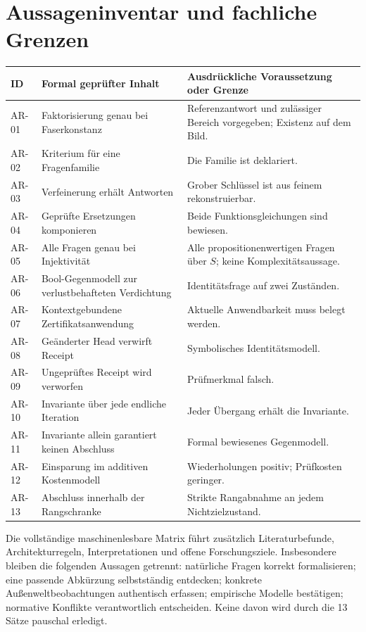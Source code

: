 \documentclass[11pt,a4paper]{article}
\begin{document}
\section{Aussageninventar und fachliche Grenzen}
\small
\begin{longtable}{@{}p{14mm}p{68mm}p{65mm}@{}}
\toprule ID & Formal geprüfter Inhalt & Ausdrückliche Voraussetzung oder Grenze\\\midrule\endhead
AR-01 & Faktorisierung genau bei Faserkonstanz & Referenzantwort und zulässiger Bereich vorgegeben; Existenz auf dem Bild.\\
AR-02 & Kriterium für eine Fragenfamilie & Die Familie ist deklariert.\\
AR-03 & Verfeinerung erhält Antworten & Grober Schlüssel ist aus feinem rekonstruierbar.\\
AR-04 & Geprüfte Ersetzungen komponieren & Beide Funktionsgleichungen sind bewiesen.\\
AR-05 & Alle Fragen genau bei Injektivität & Alle propositionenwertigen Fragen über $S$; keine Komplexitätsaussage.\\
AR-06 & Bool-Gegenmodell zur verlustbehafteten Verdichtung & Identitätsfrage auf zwei Zuständen.\\
AR-07 & Kontextgebundene Zertifikatsanwendung & Aktuelle Anwendbarkeit muss belegt werden.\\
AR-08 & Geänderter Head verwirft Receipt & Symbolisches Identitätsmodell.\\
AR-09 & Ungeprüftes Receipt wird verworfen & Prüfmerkmal falsch.\\
AR-10 & Invariante über jede endliche Iteration & Jeder Übergang erhält die Invariante.\\
AR-11 & Invariante allein garantiert keinen Abschluss & Formal bewiesenes Gegenmodell.\\
AR-12 & Einsparung im additiven Kostenmodell & Wiederholungen positiv; Prüfkosten geringer.\\
AR-13 & Abschluss innerhalb der Rangschranke & Strikte Rangabnahme an jedem Nichtzielzustand.\\\bottomrule
\end{longtable}
\normalsize
Die vollständige maschinenlesbare Matrix führt zusätzlich Literaturbefunde,
Architekturregeln, Interpretationen und offene Forschungsziele. Insbesondere
bleiben die folgenden Aussagen getrennt: natürliche Fragen korrekt formalisieren;
eine passende Abkürzung selbstständig entdecken; konkrete Außenweltbeobachtungen
authentisch erfassen; empirische Modelle bestätigen; normative Konflikte
verantwortlich entscheiden. Keine davon wird durch die 13 Sätze pauschal erledigt.
\end{document}
